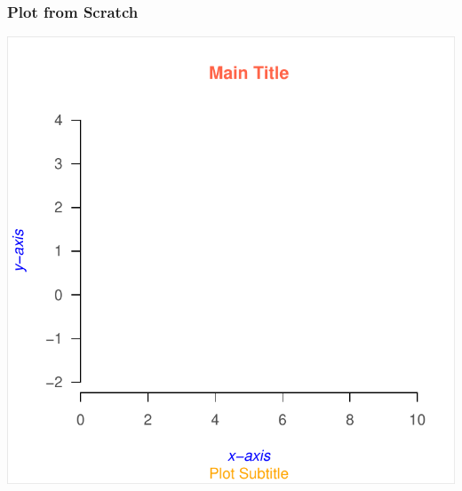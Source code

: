 \documentclass[12pt]{beamer}\usepackage[]{graphicx}\usepackage[]{color}
\newenvironment{knitrout}{}{} %
\begin{document}

\begin{frame}[fragile]
\frametitle{Plot from Scratch}
\begin{knitrout}\scriptsize
{}\color{fgcolor}

{\centering \includegraphics[width=.6\linewidth,height=.6\linewidth]{figure/bare_plot-1} 

}



\end{knitrout}
\end{frame}

\end{document}
